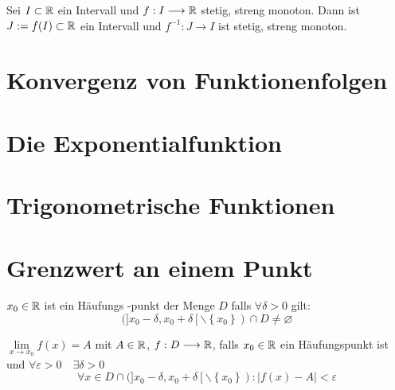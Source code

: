 \Satz[Umkehrabbildung] Sei $I \subset \mathbb{R}$ ein Intervall und $f: I \longrightarrow \mathbb{R}$ stetig, streng monoton. Dann ist $J:=f(I) \subset \mathbb{R}$ ein Intervall und $f^{-1}: J \longrightarrow I$ ist stetig, streng monoton.

\section{Konvergenz von Funktionenfolgen}

\section{Die Exponentialfunktion}

\section{Trigonometrische Funktionen}

\section{Grenzwert an einem Punkt}

\Def[Häufungspunkt] $x_{0} \in \mathbb{R}$ ist ein Häufungs -punkt der Menge $D$ falls $\forall \delta>0$ gilt:
$$(]x_{0}-\delta, x_{0}+\delta\left[\backslash\left\{x_{0}\right\}\right) \cap D \neq \varnothing$$

\Def[Grenzwert] $\lim \limits_{x \rightarrow x_0} f(x) = A$ 
mit $A \in \mathbb{R}$, $f: D \longrightarrow \mathbb{R}$, falls $x_0 \in \mathbb{R}$ ein Häufungspunkt ist und $\forall \varepsilon>0 \quad \exists \delta>0$
$$\forall x \in D \cap(] x_{0}-\delta, x_{0}+\delta\left[\backslash\left\{x_{0}\right\}\right):|f(x)-A|<\varepsilon$$

